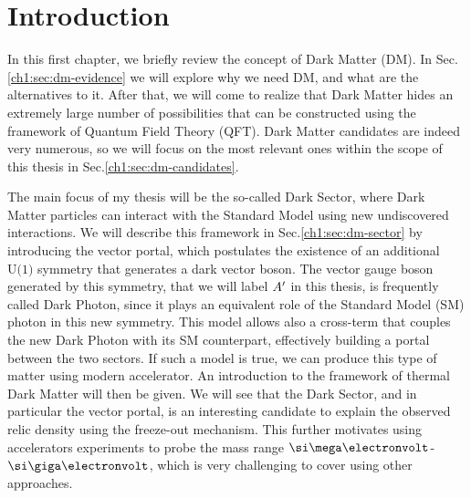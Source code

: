 
\newcommand{\pdirone}{chapters/plots/chapter1}

\chapter{Introduction}

\label{chapter1}

In this first chapter, we briefly review the concept of Dark Matter (DM). In Sec.\ref{ch1:sec:dm-evidence} we will explore why we need DM, and what are the alternatives to it. After that, we will come to realize that Dark Matter hides an extremely large number of possibilities that can be constructed using the framework of Quantum Field Theory (QFT). Dark Matter candidates are indeed very numerous, so we will focus on the most relevant ones within the scope of this thesis in Sec.\ref{ch1:sec:dm-candidates}.

The main focus of my thesis will be the so-called Dark Sector, where Dark Matter particles can interact with the Standard Model using new undiscovered interactions. We will describe this framework in Sec.\ref{ch1:sec:dm-sector}  by introducing the vector portal, which postulates the existence of an additional $\textrm{U(1)}$ symmetry that generates a dark vector boson. The vector gauge boson generated by this symmetry, that we will label $A'$ in this thesis,  is frequently called Dark Photon, since it plays an equivalent role of the Standard Model (SM) photon in this new symmetry. This model allows also a cross-term that couples the new Dark Photon with its SM counterpart, effectively building a portal between the two sectors. If such a model is true, we can produce this type of matter using modern accelerator. An introduction to the framework of thermal Dark Matter will then be given. We will see that the Dark Sector, and in particular the vector portal, is an interesting candidate to explain the observed relic density using the freeze-out mechanism. This further motivates using accelerators experiments to probe the mass range $\mev$-$\gev$, which is very challenging to cover using other approaches.

